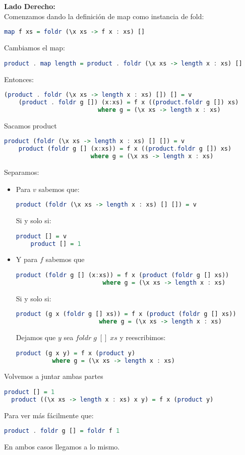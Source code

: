 \documentclass[spanish,12pt,letterpaper]{article}
\begin{document}
\begin{enumerate}
\textbf{Lado Derecho:}\\
Comenzamos dando la definición de map como instancia de fold:
\begin{lstlisting}[language=Haskell]
    map f xs = foldr (\x xs -> f x : xs) []\end{lstlisting}
Cambiamos el map:
\begin{lstlisting}[language=Haskell]
    product . map length = product . foldr (\x xs -> length x : xs) []\end{lstlisting}
Entonces:
\begin{lstlisting}[language=Haskell]
    (product . foldr (\x xs -> length x : xs) []) [] = v
    (product . foldr g []) (x:xs) = f x ((product.foldr g []) xs)
                          where g = (\x xs -> length x : xs) \end{lstlisting}
Sacamos product
\begin{lstlisting}[language=Haskell]
    product (foldr (\x xs -> length x : xs) [] []) = v
    product (foldr g [] (x:xs)) = f x ((product.foldr g []) xs)
                        where g = (\x xs -> length x : xs) \end{lstlisting}
Separamos:
\begin{itemize}
\item Para $v$ sabemos que:
\begin{lstlisting}[language=Haskell]
    product (foldr (\x xs -> length x : xs) [] []) = v\end{lstlisting}
Si y solo si:
\begin{lstlisting}[language=Haskell]
    product [] = v
    product [] = 1\end{lstlisting}
\item Y para $f$ sabemos que
\begin{lstlisting}[language=Haskell]
    product (foldr g [] (x:xs)) = f x (product (foldr g [] xs))
                        where g = (\x xs -> length x : xs)\end{lstlisting}
Si y solo si:
\begin{lstlisting}[language=Haskell]
 product (g x (foldr g [] xs)) = f x (product (foldr g [] xs))
                       where g = (\x xs -> length x : xs)\end{lstlisting}
Dejamos que $y$ sea $foldr\;g\;[]\;xs$ y reescribimos:
\begin{lstlisting}[language=Haskell]
  product (g x y) = f x (product y)
          where g = (\x xs -> length x : xs)\end{lstlisting}
\end{itemize}
Volvemos a juntar ambas partes
\begin{lstlisting}[language=Haskell]
  product [] = 1
  product ((\x xs -> length x : xs) x y) = f x (product y)\end{lstlisting}
Para ver más fácilmente que:
\begin{lstlisting}[language=Haskell]
  product . foldr g [] = foldr f 1\end{lstlisting}

En ambos casos llegamos a lo mismo.
\end{enumerate}
\end{document}
